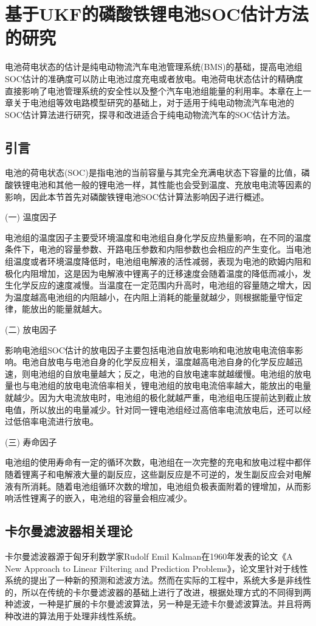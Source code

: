 
\chapter{基于UKF的磷酸铁锂电池SOC估计方法的研究}
电池荷电状态的估计是纯电动物流汽车电池管理系统(BMS)的基础，提高电池组SOC估计的准确度可以防止电池过度充电或者放电。电池荷电状态估计的精确度直接影响了电池管理系统的安全性以及整个汽车电池组能量的利用率。本章在上一章关于电池组等效电路模型研究的基础上，对于适用于纯电动物流汽车电池的SOC估计算法进行研究，探寻和改进适合于纯电动物流汽车的SOC估计方法。
\section{引言}
电池的荷电状态(SOC)是指电池的当前容量与其完全充满电状态下容量的比值，磷酸铁锂电池和其他一般的锂电池一样，其性能也会受到温度、充放电电流等因素的影响，因此本节首先对磷酸铁锂电池SOC估计算法影响因子进行概述。

(一)	温度因子

	电池组的温度因子主要受环境温度和电池组自身化学反应热量影响，在不同的温度条件下，电池的容量参数、开路电压参数和内阻参数也会相应的产生变化。当电池组温度或者环境温度降低时，电池组电解液的活性减弱，表现为电池的欧姆内阻和极化内阻增加，这是因为电解液中锂离子的迁移速度会随着温度的降低而减小，发生化学反应的速度减慢。当温度在一定范围内升高时，电池组的容量随之增大，因为温度越高电池组的内阻越小，在内阻上消耗的能量就越少，则根据能量守恒定律，能放出的能量就越大。

(二)	放电因子

	影响电池组SOC估计的放电因子主要包括电池自放电影响和电池放电电流倍率影响。电池自放电与电池自身的化学反应相关，温度越高电池自身的化学反应越迅速，则电池组的自放电量越大；反之，电池的自放电速率就越缓慢。电池组的放电量也与电池组的放电电流倍率相关，锂电池组的放电电流倍率越大，能放出的电量就越少。因为大电流放电时，电池组的极化就越严重，电池组电压提前达到截止放电值，所以放出的电量减少。针对同一锂电池组经过高倍率电流放电后，还可以经过低倍率电流进行放电。

(三)	寿命因子

	电池组的使用寿命有一定的循环次数，电池组在一次完整的充电和放电过程中都伴随着锂离子和电解液大量的副反应，这些副反应是不可逆的，发生副反应会对电解液有所消耗。随着电池组循环次数的增加，电池组负极表面附着的锂增加，从而影响活性锂离子的嵌入，电池组的容量会相应减少。
\section{卡尔曼滤波器相关理论}
卡尔曼滤波器源于匈牙利数学家Rudolf Emil Kalman在1960年发表的论文《A New Approach to Linear Filtering and Prediction Problems》，论文里针对于线性系统的提出了一种新的预测和滤波方法。然而在实际的工程中，系统大多是非线性的，所以在传统的卡尔曼滤波器的基础上进行了改进，根据处理方式的不同得到两种滤波，一种是扩展的卡尔曼滤波算法，另一种是无迹卡尔曼滤波算法。并且将两种改进的算法用于处理非线性系统。
